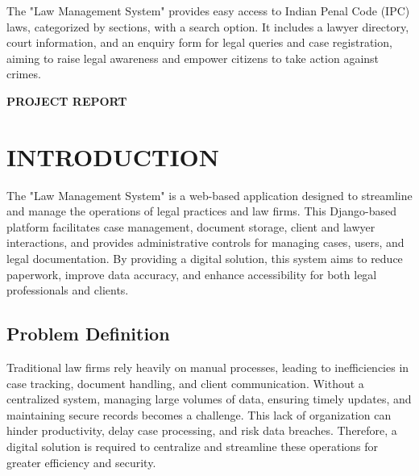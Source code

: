The "Law Management System" provides easy access to Indian Penal Code (IPC) laws, categorized by sections, with a search option. It includes a lawyer directory, court information, and an enquiry form for legal queries and case registration, aiming to raise legal awareness and empower citizens to take action against crimes.
%
%
%
\clearpage
{}
\tableofcontents
%
%
\clearpage
{}
\listoftables
%
%
\clearpage
{}
\listoffigures
%
%
\mainmatter
%
\clearpage
\quad\vfill
\begin{center}
{\Huge \bf PROJECT REPORT}
\end{center}
\vfill
\clearpage
%
%
% 
%
%
%  
\chapter{INTRODUCTION}
The "Law Management System" is a web-based application designed to streamline and manage the operations of legal practices and law firms. This Django-based platform facilitates case management, document storage, client and lawyer interactions, and provides administrative controls for managing cases, users, and legal documentation. By providing a digital solution, this system aims to reduce paperwork, improve data accuracy, and enhance accessibility for both legal professionals and clients.
\section{Problem Definition}
Traditional law firms rely heavily on manual processes, leading to inefficiencies in case tracking, document handling, and client communication. Without a centralized system, managing large volumes of data, ensuring timely updates, and maintaining secure records becomes a challenge. This lack of organization can hinder productivity, delay case processing, and risk data breaches. Therefore, a digital solution is required to centralize and streamline these operations for greater efficiency and security.
